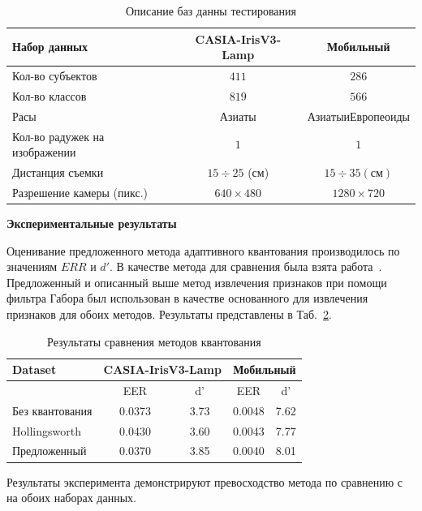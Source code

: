\begin{table}[h]
	\centering
	\begin{tabular}{|l|c|c|} \hline
		\textbf{Набор данных}					& \textbf{CASIA-IrisV3-Lamp}		& \textbf{Мобильный}\\\hline
		Кол-во субъектов 				& $411$					& $286$\\					
		Кол-во классов 					& $819$					& $566$\\
		Расы 							& $Азиаты$				& $Азиаты и Европеоиды$\\
		Кол-во радужек на изображении 	& $1$					& $1$\\
		Дистанция съемки 				& $15\div25$ (см)		& $15\div35 (см)$\\
		Разрешение камеры (пикс.) 		& $640\times480$		& $1280\times720$\\
		\hline
	\end{tabular}
	\caption{Описание баз данны тестирования}
	\label{tab:fem-gabor-dataset-spec}
\end{table}

{\bf Экспериментальные результаты}
\label{sec:fem-gabor-exp-results}

Оценивание предложенного метода адаптивного квантования производилось по значениям $ERR$ и $d'$. В качестве метода для сравнения была взята работа~\cite{hollingsworth_2009}. Предложенный и описанный выше метод извлечения признаков при помощи фильтра Габора был использован в качестве основанного для извлечения признаков для обоих методов. Результаты представлены в Таб.~\ref{tab:fem-gabor-quant-exp-results}.

\begin{table}[h]
	\centering
	\begin{tabular}{|l|c|c|c|c|}\hline
		\textbf{Dataset}&\multicolumn{2}{c|}{\textbf{CASIA-IrisV3-Lamp}}&\multicolumn{2}{c|}{\textbf{Мобильный}}\\\hline
												&EER		&d'			&EER		&d'\\
		Без квантования							&0.0373		&3.73		&0.0048		&7.62\\
		Hollingsworth~\cite{hollingsworth_2009}	&0.0430		&3.60		&0.0043		&7.77\\
		Предложенный							&0.0370		&3.85		&0.0040		&8.01\\
		\hline
	\end{tabular}
	\caption{Результаты сравнения методов квантования}
	\label{tab:fem-gabor-quant-exp-results}
\end{table}

Результаты эксперимента демонстрируют превосходство метода по сравнению с~\cite{hollingsworth_2009} на обоих наборах данных.

